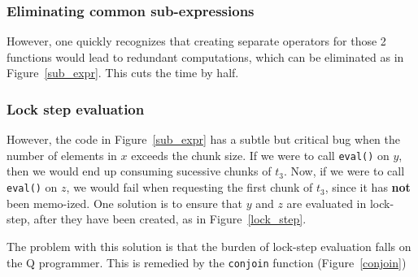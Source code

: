 \subsubsection{Eliminating common sub-expressions}
However, one quickly recognizes that creating separate operators for those 2
functions would lead to 
redundant computations, which can be eliminated as in Figure~\ref{sub_expr}.
This cuts the time by half.

\begin{figure}
\centering
{}
\end{figure}


\subsubsection{Lock step evaluation}
However, the code in Figure~\ref{sub_expr} has a subtle but
critical bug when the number of elements in \(x\) exceeds the chunk
size.  If we were to call {\tt eval()} on \(y\), then we would
end up consuming sucessive chunks of \(t_3\). Now, if we were to call
{\tt eval()} on \(z\), we would fail when requesting the first
chunk of \(t_3\), since it has {\bf not} been memo-ized. One solution
is to ensure that \(y\) and \(z\) are evaluated in lock-step, after they have
been created, as in Figure~\ref{lock_step}.
\begin{figure}
\centering
{}
\end{figure}

The problem with this solution is that the burden of lock-step evaluation falls
on the Q programmer. This is remedied by the {\tt conjoin} function
(Figure~\ref{conjoin})

\begin{figure}
\centering
{}
\end{figure}


